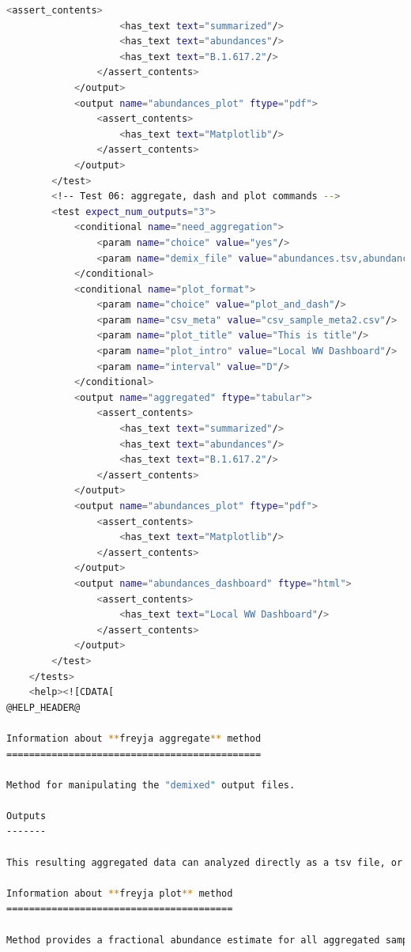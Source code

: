 \begin{lstlisting}[language=bash, caption=tool wrapper for Freyja: Aggregate and visualize demixed results, label=list:methods:wrapper-freyja-agg]
                <assert_contents>
                    <has_text text="summarized"/>
                    <has_text text="abundances"/>
                    <has_text text="B.1.617.2"/>
                </assert_contents>
            </output>
            <output name="abundances_plot" ftype="pdf">
                <assert_contents>
                    <has_text text="Matplotlib"/>
                </assert_contents>
            </output>
        </test>
        <!-- Test 06: aggregate, dash and plot commands -->
        <test expect_num_outputs="3">
            <conditional name="need_aggregation">
                <param name="choice" value="yes"/>
                <param name="demix_file" value="abundances.tsv,abundances2.tsv,abundances3.tsv"/>
            </conditional>
            <conditional name="plot_format">
                <param name="choice" value="plot_and_dash"/>
                <param name="csv_meta" value="csv_sample_meta2.csv"/>
                <param name="plot_title" value="This is title"/>
                <param name="plot_intro" value="Local WW Dashboard"/>
                <param name="interval" value="D"/>
            </conditional>
            <output name="aggregated" ftype="tabular">
                <assert_contents>
                    <has_text text="summarized"/>
                    <has_text text="abundances"/>
                    <has_text text="B.1.617.2"/>
                </assert_contents>
            </output>
            <output name="abundances_plot" ftype="pdf">
                <assert_contents>
                    <has_text text="Matplotlib"/>
                </assert_contents>
            </output>
            <output name="abundances_dashboard" ftype="html">
                <assert_contents>
                    <has_text text="Local WW Dashboard"/>
                </assert_contents>
            </output>
        </test>
    </tests>
    <help><![CDATA[
@HELP_HEADER@

Information about **freyja aggregate** method
=============================================

Method for manipulating the "demixed" output files. 

Outputs
-------

This resulting aggregated data can analyzed directly as a tsv file, or can be visualized using *freyja plot* and *freyja dash*.

Information about **freyja plot** method
========================================

Method provides a fractional abundance estimate for all aggregated samples.


\end{lstlisting}
